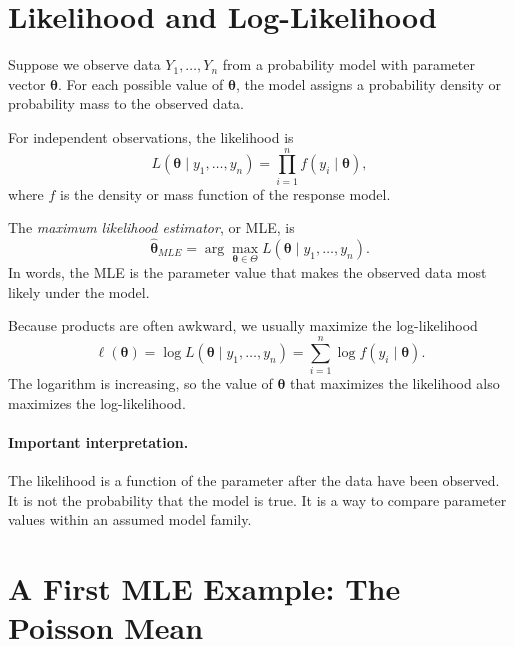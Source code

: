 \section{Likelihood and Log-Likelihood}

Suppose we observe data \(Y_1,\ldots,Y_n\) from a probability model with parameter vector \(\boldsymbol{\theta}\).  For each possible value of \(\boldsymbol{\theta}\), the model assigns a probability density or probability mass to the observed data.

For independent observations, the likelihood is
\begin{equation}
  L(\boldsymbol{\theta}\mid y_1,\ldots,y_n)
  = \prod_{i=1}^n f(y_i\mid \boldsymbol{\theta}),
  \label{eq:ch14-likelihood}
\end{equation}
where \(f\) is the density or mass function of the response model.

The \emph{maximum likelihood estimator}, or MLE, is
\begin{equation}
  \widehat{\boldsymbol{\theta}}_{MLE}
  =\arg\max_{\boldsymbol{\theta}\in\Theta}
  L(\boldsymbol{\theta}\mid y_1,\ldots,y_n).
\end{equation}
In words, the MLE is the parameter value that makes the observed data most likely under the model.

Because products are often awkward, we usually maximize the log-likelihood
\begin{equation}
  \ell(\boldsymbol{\theta})
  =\log L(\boldsymbol{\theta}\mid y_1,\ldots,y_n)
  =\sum_{i=1}^n \log f(y_i\mid \boldsymbol{\theta}).
  \label{eq:ch14-loglikelihood}
\end{equation}
The logarithm is increasing, so the value of \(\boldsymbol{\theta}\) that maximizes the likelihood also maximizes the log-likelihood.

\paragraph{Important interpretation.}
The likelihood is a function of the parameter after the data have been observed.  It is not the probability that the model is true.  It is a way to compare parameter values within an assumed model family.

\section{A First MLE Example: The Poisson Mean}

